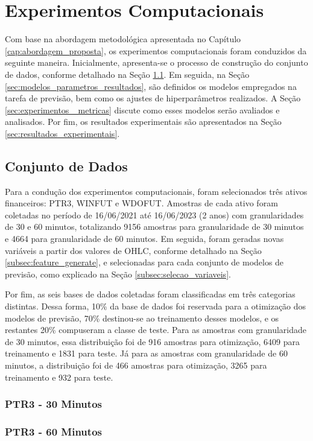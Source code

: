 \chapter{Experimentos Computacionais}
\label{cap:experimentos}
Com base na abordagem metodológica apresentada no Capítulo \ref{cap:abordagem_proposta}, os experimentos computacionais foram conduzidos da seguinte maneira. Inicialmente, apresenta-se o processo de construção do conjunto de dados, conforme detalhado na Seção \ref{sec:conjunto_dados_resultados}. Em seguida, na Seção \ref{sec:modelos_parametros_resultados}, são definidos os modelos empregados na tarefa de previsão, bem como os ajustes de hiperparâmetros realizados. A Seção \ref{sec:experimentos _metricas} discute como esses modelos serão avaliados e analisados. Por fim, os resultados experimentais são apresentados na Seção \ref{sec:resultados_experimentais}.


\section{Conjunto de Dados}
\label{sec:conjunto_dados_resultados}
Para a condução dos experimentos computacionais, foram selecionados três ativos financeiros: PTR3, WINFUT e WDOFUT. Amostras de cada ativo foram coletadas no período de 16/06/2021 até 16/06/2023 (2 anos) com granularidades de 30 e 60 minutos, totalizando 9156 amostras para granularidade de 30 minutos e 4664 para granularidade de 60 minutos.
Em seguida, foram geradas novas variáveis a partir dos valores de \ac{OHLC}, conforme detalhado na Seção \ref{subsec:feature_generate}, e selecionadas para cada conjunto de modelos de previsão, como explicado na Seção \ref{subsec:selecao_variaveis}.

Por fim, as seis bases de dados coletadas foram classificadas em três categorias distintas. Dessa forma, 10\% da base de dados foi reservada para a otimização dos modelos de previsão, 70\% destinou-se ao treinamento desses modelos, e os restantes 20\% compuseram a classe de teste. Para as amostras com granularidade de 30 minutos, essa distribuição foi de 916 amostras para otimização, 6409 para treinamento e 1831 para teste. Já para as amostras com granularidade de 60 minutos, a distribuição foi de 466 amostras para otimização, 3265 para treinamento e 932 para teste.

\subsection{PTR3 - 30 Minutos}
\subsection{PTR3 - 60 Minutos}

